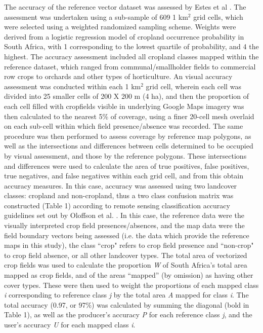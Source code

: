 \documentclass[11pt, titlepage]{article}
\begin{document}
The accuracy of the reference vector dataset was assessed by Estes et al \cite{estes_platform_2015}. The assessment was undertaken using a sub-sample of 609 1 km$^2$ grid cells, which were selected using a weighted randomized sampling scheme. Weights were derived from a logistic regression model of cropland occurrence probability in South Africa, with 1 corresponding to the lowest quartile of probability, and 4 the highest. The accuracy assessment included all cropland classes mapped within the reference dataset, which ranged from communal/smallholder fields to commercial row crops to orchards and other types of horticulture. An visual accuracy assessment was conducted within each 1 km$^2$ grid cell, wherein each cell was divided into 25 smaller cells of 200 X 200 m (4 ha), and then the proportion of each cell filled with cropfields visible in underlying Google Maps imagery was then calculated to the nearest 5\% of coverage, using a finer 20-cell mesh overlaid on each sub-cell within which field presence/absence was recorded. The same procedure was then performed to assess coverage by reference map polygons, as well as the intersections and differences between cells determined to be occupied by visual assessment, and those by the reference polygons. These intersections and differences were used to calculate the area of true positives, false positives, true negatives, and false negatives within each grid cell, and from this obtain accuracy measures.  In this case, accuracy was assessed using two landcover classes: cropland and non-cropland, thus a two class confusion matrix was constructed (Table 1) according to remote sensing classification accuracy guidelines set out by Oloffson et al. \cite{olofsson_good_2014}. In this case, the reference data were the visually interpreted crop field presences/absences, and the map data were the field boundary vectors being assessed (i.e. the data which provide the reference maps in this study), the class ``crop" refers to crop field presence and ``non-crop" to crop field absence, or all other landcover types.  The total area of vectorized crop fields was used to calculate the proportion \emph{W} of South Africa's total area mapped as crop fields, and of the areas ``mapped'' (by omission) as having other cover types.  These were then used to weight the proportions of each mapped class \emph{i} corresponding to reference class \emph{j} by the total area \emph{A} mapped for class \emph{i}. The total accuracy (0.97, or 97\%) was calculated by summing the diagonal (bold in Table 1), as well as the producer's accuracy \emph{P} for each reference class \emph{j}, and the user's accuracy \emph{U} for each mapped class \emph{i}.  
\end{document}
